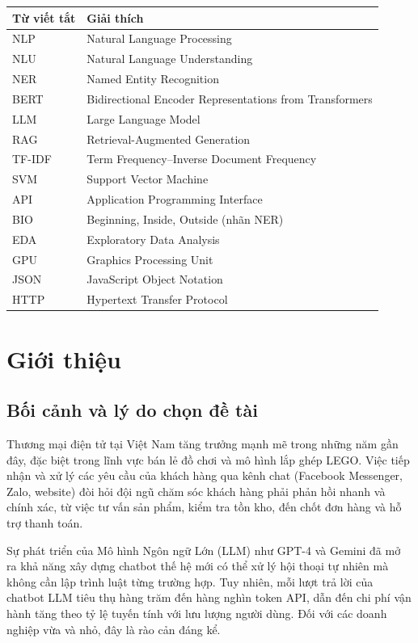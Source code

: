 \documentclass[12pt, a4paper]{report}
\begin{document}
\begin{tabular}{ll}
\toprule
\textbf{Từ viết tắt} & \textbf{Giải thích} \\
\midrule
NLP  & Natural Language Processing \\
NLU  & Natural Language Understanding \\
NER  & Named Entity Recognition \\
BERT & Bidirectional Encoder Representations from Transformers \\
LLM  & Large Language Model \\
RAG  & Retrieval-Augmented Generation \\
TF-IDF & Term Frequency–Inverse Document Frequency \\
SVM  & Support Vector Machine \\
API  & Application Programming Interface \\
BIO  & Beginning, Inside, Outside (nhãn NER) \\
EDA  & Exploratory Data Analysis \\
GPU  & Graphics Processing Unit \\
JSON & JavaScript Object Notation \\
HTTP & Hypertext Transfer Protocol \\
\bottomrule
\end{tabular}

\chapter{Giới thiệu}

\section{Bối cảnh và lý do chọn đề tài}

Thương mại điện tử tại Việt Nam tăng trưởng mạnh mẽ trong những năm gần đây,
đặc biệt trong lĩnh vực bán lẻ đồ chơi và mô hình lắp ghép LEGO.
Việc tiếp nhận và xử lý các yêu cầu của khách hàng qua kênh chat (Facebook Messenger,
Zalo, website) đòi hỏi đội ngũ chăm sóc khách hàng phải phản hồi nhanh và chính xác,
từ việc tư vấn sản phẩm, kiểm tra tồn kho, đến chốt đơn hàng và hỗ trợ thanh toán.

Sự phát triển của Mô hình Ngôn ngữ Lớn (LLM) như GPT-4 và Gemini đã mở ra khả năng
xây dựng chatbot thế hệ mới có thể xử lý hội thoại tự nhiên mà không cần lập trình
luật từng trường hợp. Tuy nhiên, mỗi lượt trả lời của chatbot LLM tiêu thụ hàng trăm
đến hàng nghìn token API, dẫn đến chi phí vận hành tăng theo tỷ lệ tuyến tính với
lưu lượng người dùng. Đối với các doanh nghiệp vừa và nhỏ, đây là rào cản đáng kể.
\end{document}
